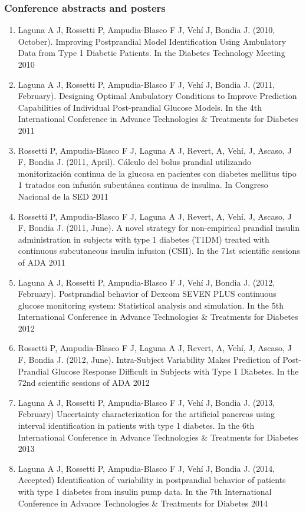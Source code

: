 \subsubsection*{Conference abstracts and posters}
\begin{enumerate}
	\item Laguna A J, Rossetti P, Ampudia-Blasco F J, Veh\'{i} J, Bondia J. (2010, October). Improving Postprandial Model Identification Using Ambulatory Data from Type 1 Diabetic Patients. In the Diabetes Technology Meeting 2010
	\item Laguna A J, Rossetti P, Ampudia-Blasco F J, Veh\'{i} J, Bondia J. (2011, February). Designing Optimal Ambulatory Conditions to Improve Prediction Capabilities of Individual Post-prandial Glucose Models. In the 4th International Conference in Advance Technologies \& Treatments for Diabetes 2011
	\item Rossetti P, Ampudia-Blasco F J, Laguna A J, Revert, A, Veh\'{i}, J, Ascaso, J F, Bondia J. (2011, April). C\'alculo del bolus prandial utilizando monitorizaci\'on continua de la glucosa en pacientes con diabetes mellitus tipo 1 tratados con infusi\'on subcut\'anea continua de insulina. In Congreso Nacional de la SED 2011
	\item Rossetti P, Ampudia-Blasco F J, Laguna A J, Revert, A, Veh\'{i}, J, Ascaso, J F, Bondia J. (2011, June). A novel strategy for non-empirical prandial insulin administration in subjects with type 1 diabetes (T1DM) treated with continuous subcutaneous insulin infusion (CSII). In the 71st scientific sessions of ADA 2011
	\item Laguna A J, Rossetti P, Ampudia-Blasco F J, Veh\'{i} J, Bondia J. (2012, February). Postprandial behavior of Dexcom\textsuperscript{\textregistered} SEVEN\textsuperscript{\textregistered} PLUS continuous glucose monitoring system: Statistical analysis and simulation. In the 5th International Conference in Advance Technologies \& Treatments for Diabetes 2012
	\item Rossetti P, Ampudia-Blasco F J, Laguna A J, Revert, A, Veh\'{i}, J, Ascaso, J F, Bondia J. (2012, June). Intra-Subject Variability Makes Prediction of Post-Prandial Glucose Response Difficult in Subjects with Type 1 Diabetes. In the 72nd scientific sessions of ADA 2012
	\item Laguna A J, Rossetti P, Ampudia-Blasco F J, Veh\'{i} J, Bondia J. (2013, February) Uncertainty characterization for the artificial pancreas using interval identification in patients with type 1 diabetes. In the 6th International Conference in Advance Technologies \& Treatments for Diabetes 2013
	\item Laguna A J, Rossetti P, Ampudia-Blasco F J, Veh\'{i} J, Bondia J. (2014, Accepted) Identification of variability in postprandial behavior of patients with type 1 diabetes from insulin pump data. In the 7th International Conference in Advance Technologies \& Treatments for Diabetes 2014
\end{enumerate}


 





